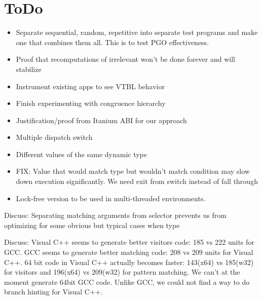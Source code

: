 \documentclass[submission,copyright]{eptcs}
\begin{document}

\section{ToDo} %
\begin{itemize}
\item Separate sequential, random, repetitive into separate test programs
      and make one that combines them all. This is to test PGO effectiveness.
\item Proof that recomputations of irrelevant won't be done forever and will 
      stabilize
\item Instrument existing apps to see VTBL behavior
\item Finish experimenting with congruence hierarchy
\item Justification/proof from Itanium ABI for our approach
\item Multiple dispatch switch
\item Different values of the same dynamic type
\item FIX: Value that would match type but wouldn't match condition may slow 
      down execution significantly. We need exit from switch instead of fall 
      through
\item Lock-free version to be used in multi-threaded environments.
\end{itemize}

Discuss: Separating matching arguments from selector prevents us from optimizing
for some obvious but typical cases when type 

Discuss:
Visual C++ seems to generate better visitors code: 185 vs 222 units for GCC.
GCC seems to generate better matching code: 208 vs 209 units for Visual C++.
64 bit code in Visual C++ actually becomes faster: 143(x64) vs 185(w32) for 
visitors and 196(x64) vs 209(w32) for pattern matching. We can't at the moment 
generate 64bit GCC code.
Unlike GCC, we could not find a way to do branch hinting for Visual C++.
\end{document}
